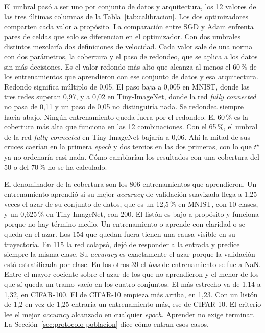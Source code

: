 El umbral pasó a ser uno por conjunto de datos y arquitectura, los 12 valores de las tres últimas columnas de la Tabla~\ref{tab:calibracion}. Los dos optimizadores comparten cada valor a propósito. La comparación entre SGD y Adam enfrenta pares de celdas que solo se diferencian en el optimizador. Con dos umbrales distintos mezclaría dos definiciones de velocidad. Cada valor sale de una norma con dos parámetros, la cobertura y el paso de redondeo, que se aplica a los datos sin más decisiones. Es el valor redondo más alto que alcanza al menos el 60\,\% de los entrenamientos que aprendieron con ese conjunto de datos y esa arquitectura. Redondo significa múltiplo de 0,05. El paso baja a 0,005 en MNIST, donde las tres redes superan 0,97, y a 0,02 en Tiny-ImageNet, donde la red \emph{fully connected} no pasa de 0,11 y un paso de 0,05 no distinguiría nada. Se redondea siempre hacia abajo. Ningún entrenamiento queda fuera por el redondeo. El 60\,\% es la cobertura más alta que funciona en las 12 combinaciones. Con el 65\,\%, el umbral de la red \emph{fully connected} en Tiny-ImageNet bajaría a 0,06. Ahí la mitad de sus cruces caerían en la primera \emph{epoch} y dos tercios en las dos primeras, con lo que $t^\star$ ya no ordenaría casi nada. Cómo cambiarían los resultados con una cobertura del 50 o del 70\,\% no se ha calculado.

El denominador de la cobertura son los 806 entrenamientos que aprendieron. Un entrenamiento aprendió si su mejor \emph{accuracy} de validación suavizada llega a 1,25 veces el azar de su conjunto de datos, que es un 12,5\,\% en MNIST, con 10 clases, y un 0,625\,\% en Tiny-ImageNet, con 200. El listón es bajo a propósito y funciona porque no hay término medio. Un entrenamiento o aprende con claridad o se queda en el azar. Los 154 que quedan fuera tienen una causa visible en su trayectoria. En 115 la red colapsó, dejó de responder a la entrada y predice siempre la misma clase. Su \emph{accuracy} es exactamente el azar porque la validación está estratificada por clase. En los otros 39 el \emph{loss} de entrenamiento se fue a NaN. Entre el mayor cociente sobre el azar de los que no aprendieron y el menor de los que sí queda un tramo vacío en los cuatro conjuntos. El más estrecho va de 1,14 a 1,32, en CIFAR-100. El de CIFAR-10 empieza más arriba, en 1,23. Con un listón de 1,2 en vez de 1,25 entraría un entrenamiento más, ese de CIFAR-10. El criterio lee el mejor \emph{accuracy} alcanzado en cualquier \emph{epoch}. Aprender no exige terminar. La Sección~\ref{sec:protocolo-poblacion} dice cómo entran esos casos.

